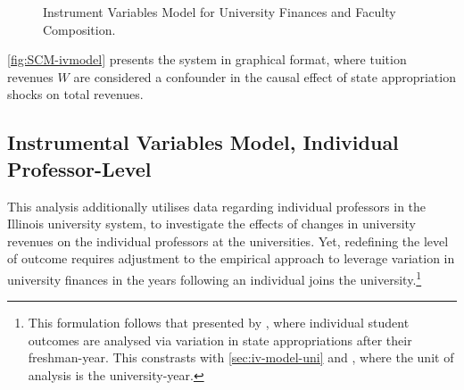\documentclass[notitlepage,12pt]{article}
\begin{document}
\begin{figure}[H]
    \centering
    \caption{Instrument Variables Model for University Finances and Faculty Composition.}
    \label{fig:SCM-ivmodel}
\end{figure}

\autoref{fig:SCM-ivmodel} presents the system in graphical format, where tuition revenues $W$ are considered a confounder in the causal effect of state appropriation shocks on total revenues.


\subsection{Instrumental Variables Model, Individual Professor-Level}
\label{sec:iv-model-indiv}

This analysis additionally utilises data regarding individual professors in the Illinois university system, to investigate the effects of changes in university revenues on the individual professors at the universities.
Yet, redefining the level of outcome requires adjustment to the empirical approach to leverage variation in university finances in the years following an individual joins the university.\footnote{
    This formulation follows that presented by \cite{NBERw27885}, where individual student outcomes are analysed via variation in state appropriations after their freshman-year.
    This constrasts with \autoref{sec:iv-model-uni} and \cite{NBERw23736}, where the unit of analysis is the university-year.
}
\end{document}

